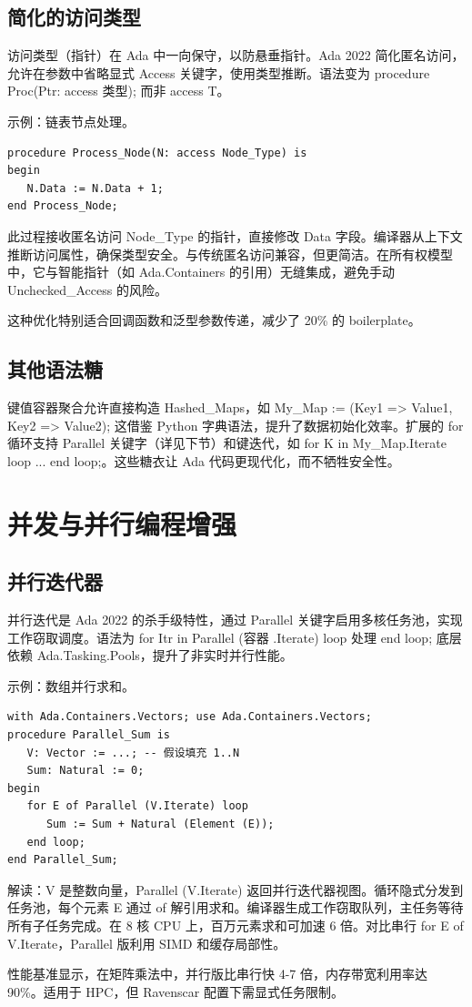 \section{简化的访问类型}
访问类型（指针）在 Ada 中一向保守，以防悬垂指针。Ada 2022 简化匿名访问，允许在参数中省略显式 Access 关键字，使用类型推断。语法变为 procedure Proc(Ptr: access 类型); 而非 access T。\par
示例：链表节点处理。\par
\begin{lstlisting}
procedure Process_Node(N: access Node_Type) is
begin
   N.Data := N.Data + 1;
end Process_Node;
\end{lstlisting}
此过程接收匿名访问 Node\_{}Type 的指针，直接修改 Data 字段。编译器从上下文推断访问属性，确保类型安全。与传统匿名访问兼容，但更简洁。在所有权模型中，它与智能指针（如 Ada.Containers 的引用）无缝集成，避免手动 Unchecked\_{}Access 的风险。\par
这种优化特别适合回调函数和泛型参数传递，减少了 20\%{} 的 boilerplate。\par
\section{其他语法糖}
键值容器聚合允许直接构造 Hashed\_{}Maps，如 My\_{}Map := (Key1 => Value1, Key2 => Value2); 这借鉴 Python 字典语法，提升了数据初始化效率。扩展的 for 循环支持 Parallel 关键字（详见下节）和键迭代，如 for K in My\_{}Map.Iterate loop ... end loop;。这些糖衣让 Ada 代码更现代化，而不牺牲安全性。\par
\chapter{并发与并行编程增强}
\section{并行迭代器}
并行迭代是 Ada 2022 的杀手级特性，通过 Parallel 关键字启用多核任务池，实现工作窃取调度。语法为 for Itr in Parallel (容器 .Iterate) loop 处理 end loop; 底层依赖 Ada.Tasking.Pools，提升了非实时并行性能。\par
示例：数组并行求和。\par
\begin{lstlisting}
with Ada.Containers.Vectors; use Ada.Containers.Vectors;
procedure Parallel_Sum is
   V: Vector := ...; -- 假设填充 1..N
   Sum: Natural := 0;
begin
   for E of Parallel (V.Iterate) loop
      Sum := Sum + Natural (Element (E));
   end loop;
end Parallel_Sum;
\end{lstlisting}
解读：V 是整数向量，Parallel (V.Iterate) 返回并行迭代器视图。循环隐式分发到任务池，每个元素 E 通过 of 解引用求和。编译器生成工作窃取队列，主任务等待所有子任务完成。在 8 核 CPU 上，百万元素求和可加速 6 倍。对比串行 for E of V.Iterate，Parallel 版利用 SIMD 和缓存局部性。\par
性能基准显示，在矩阵乘法中，并行版比串行快 4-7 倍，内存带宽利用率达 90\%{}。适用于 HPC，但 Ravenscar 配置下需显式任务限制。\par
